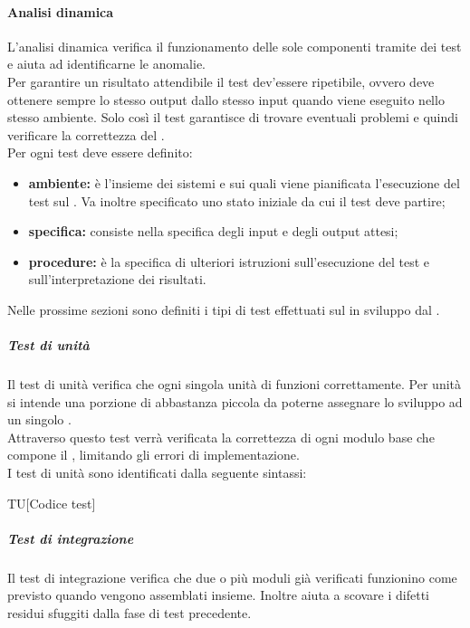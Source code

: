 	\paragraph{Analisi dinamica}
	\label{sec:3.2.1.3}
		L'analisi dinamica verifica il funzionamento delle sole componenti  tramite dei test e aiuta ad identificarne le anomalie. \\
		Per garantire un risultato attendibile il test dev'essere ripetibile, ovvero deve ottenere sempre lo stesso output dallo stesso input quando viene eseguito nello stesso ambiente. Solo così il test garantisce di trovare eventuali problemi e quindi verificare la correttezza del  . \\
		Per ogni test deve essere definito:
		\begin{itemize}
			\item \textbf{ambiente:} è l'insieme dei sistemi  e  sui quali viene pianificata l'esecuzione del test sul . Va inoltre specificato uno stato iniziale da cui il test deve partire;
			\item \textbf{specifica:} consiste nella specifica degli input e degli output attesi;
			\item \textbf{procedure:} è la specifica di ulteriori istruzioni sull'esecuzione del test e sull'interpretazione dei risultati.
		\end{itemize}
		Nelle prossime sezioni sono definiti i tipi di test effettuati sul   in sviluppo dal .
		\subparagraph{Test di unità}
		\label{sec:3.2.1.3.1}
			Il test di unità verifica che ogni singola unità di  funzioni correttamente. Per unità si intende una porzione di  abbastanza piccola da poterne assegnare lo sviluppo ad un singolo \PR. \\
			Attraverso questo test verrà verificata la correttezza di ogni modulo base che compone il , limitando gli errori di implementazione. \\
			I test di unità sono identificati dalla seguente sintassi:
			\begin{center}
				TU[Codice test]
			\end{center}
		\subparagraph{Test di integrazione}
		\label{sec:3.2.1.3.2}
			Il test di integrazione verifica che due o più moduli già verificati funzionino come previsto quando vengono assemblati insieme. Inoltre aiuta a scovare i difetti residui sfuggiti dalla fase di test precedente. \\
